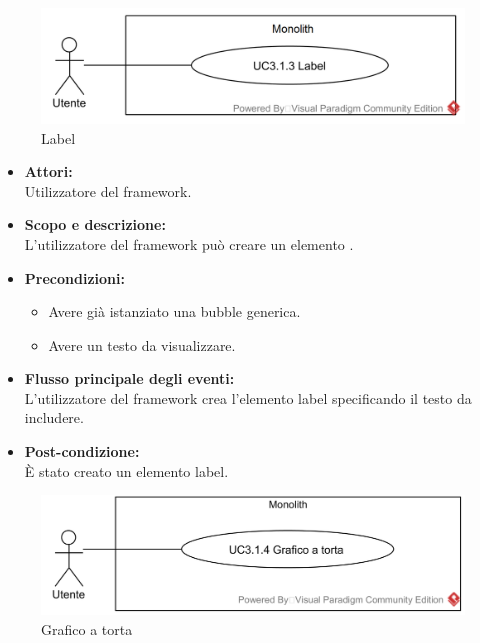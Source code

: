 \begin{samepage}
\nopagebreak
\begin{figure}[H]
	\centering
	\includegraphics[width=15cm]{../../documenti/AnalisiDeiRequisiti/Diagrammi_img/usecase/uc1_27.png}
	\caption{\UCFFCaption{} Label}
\end{figure}
\end{samepage}

\begin{itemize}
	\item \textbf{Attori:}
	\\Utilizzatore del framework.
	\item \textbf{Scopo e descrizione:} 
	\\L'utilizzatore del framework può creare un elemento .
	\item \textbf{Precondizioni:}
	\begin{itemize}
		\item Avere già istanziato una bubble generica.
		\item Avere un testo da visualizzare.
	\end{itemize}
	\item \textbf{Flusso principale degli eventi:}
	\\L'utilizzatore del framework crea l'elemento label specificando il testo da includere.
	\item \textbf{Post-condizione:}
	\\È stato creato un elemento label.
\end{itemize}

\begin{samepage}
\nopagebreak
\begin{figure}[H]
	\centering
	\includegraphics[width=15cm]{../../documenti/AnalisiDeiRequisiti/Diagrammi_img/usecase/uc1_28.png}
	\caption{\UCFFCaption{} Grafico a torta}
\end{figure}
\end{samepage}

